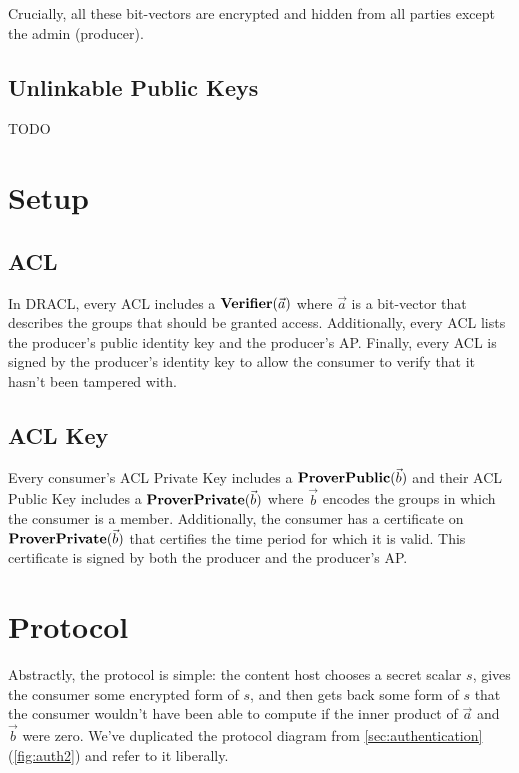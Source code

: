 \documentclass[pdftex,12pt,a4papaer,twoside,notitlepage]{report}
\begin{document}
Crucially, all these bit-vectors are encrypted and hidden from all parties
except the admin (producer).

\subsection{Unlinkable Public Keys}

TODO

\section{Setup}

\subsection{ACL}

In DRACL, every ACL includes a $\operatorname{\mathbf{Verifier}}(\vec{a})$ where $\vec{a}$ is a bit-vector that
describes the groups that should be granted access. Additionally, every ACL
lists the producer's public identity key and the producer's AP. Finally, every
ACL is signed by the producer's identity key to allow the consumer to verify
that it hasn't been tampered with.

\subsection{ACL Key}

Every consumer's ACL Private Key includes a $\operatorname{\mathbf{ProverPublic}}(\vec{b})$ and their ACL Public Key
includes a $\operatorname{\mathbf{ProverPrivate}}(\vec{b})$ where $\vec{b}$ encodes the groups in which the consumer is a
member. Additionally, the consumer has a certificate on $\operatorname{\mathbf{ProverPrivate}}(\vec{b})$ that certifies the
time period for which it is valid. This certificate is signed by both the
producer and the producer's AP.

\section{Protocol}

Abstractly, the protocol is simple: the content host chooses a secret scalar
$s$, gives the consumer some encrypted form of $s$, and then gets back some form
of $s$ that the consumer wouldn't have been able to compute if the inner product
of $\vec{a}$ and $\vec{b}$ were zero. We've duplicated the protocol diagram from
\cref{sec:authentication} (\cref{fig:auth2}) and refer to it liberally.
\end{document}
